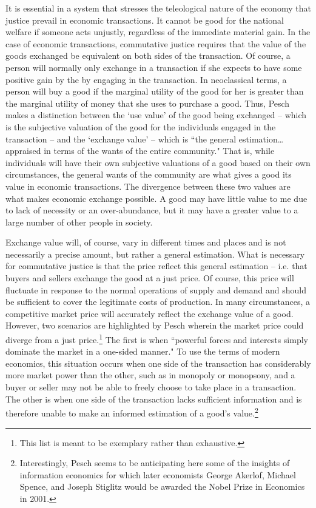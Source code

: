 \documentclass{article}
\begin{document}
It is essential in a system that stresses the teleological nature of the economy that justice prevail in economic transactions.  It cannot be good for the national welfare if someone acts unjustly, regardless of the immediate material gain.  In the case of economic transactions, commutative justice requires that the value of the goods exchanged be equivalent on both sides of the transaction.  Of course, a person will normally only exchange in a transaction if she expects to have some positive gain by the by engaging in the transaction.  In neoclassical terms, a person will buy a good if the marginal utility of the good for her is greater than the marginal utility of money that she uses to purchase a good.  Thus, Pesch makes a distinction between the ‘use value’ of the good being exchanged – which is the subjective valuation of the good for the individuals engaged in the transaction – and the ‘exchange value’ – which is ``the general estimation… appraised in terms of the wants of the entire community." \citep[p. 215]{pesch1998}  That is, while individuals will have their own subjective valuations of a good based on their own circumstances, the general wants of the community are what gives a good its value in economic transactions.  The divergence between these two values are what makes economic exchange possible.  A good may have little value to me due to lack of necessity or an over-abundance, but it may have a greater value to a large number of other people in society.\medskip

Exchange value will, of course, vary in different times and places and is not necessarily a precise amount, but rather a general estimation.  What is necessary for commutative justice is that the price reflect this general estimation – i.e. that buyers and sellers exchange the good at a just price.  Of course, this price will fluctuate in response to the normal operations of supply and demand and should be sufficient to cover the legitimate costs of production.  In many circumstances, a competitive market price will accurately reflect the exchange value of a good.  However, two scenarios are highlighted by Pesch wherein the market price could diverge from a just price.\footnote{This list is meant to be exemplary rather than exhaustive.}  The first is when ``powerful forces and interests simply dominate the market in a one-sided manner." \citep[p. 221]{pesch1998}  To use the terms of modern economics, this situation occurs when one side of the transaction has considerably more market power than the other, such as in monopoly or monopsony, and a buyer or seller may not be able to freely choose to take place in a transaction.  The other is when one side of the transaction lacks sufficient information and is therefore unable to make an informed estimation of a good’s value.\footnote{Interestingly, Pesch seems to be anticipating here some of the insights of information economics for which later economists George Akerlof, Michael Spence, and Joseph Stiglitz would be awarded the Nobel Prize in Economics in 2001.}\medskip
\end{document}
